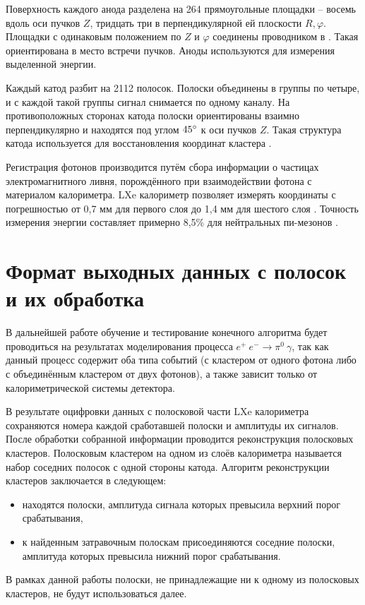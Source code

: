 \documentclass[14pt]{extarticle}
\begin{document}
Поверхность каждого анода разделена на 264 прямоугольные площадки -- восемь вдоль оси пучков $Z$, тридцать три в перпендикулярной ей плоскости $R,\varphi$. Площадки с одинаковым положением по $Z$ и $\varphi$ соединены проводником в . Такая  ориентирована в место встречи пучков. Аноды используются для измерения выделенной энергии.

Каждый катод разбит на 2112 полосок. Полоски объединены в группы по четыре, и с каждой такой группы сигнал снимается по одному каналу. На противоположных сторонах катода полоски ориентированы взаимно перпендикулярно и находятся под углом $45\degree$ к оси пучков $Z$. Такая структура катода используется для восстановления координат кластера \cite{shebalin}.

Регистрация фотонов производится путём сбора информации о частицах электромагнитного ливня, порождённого при взаимодействии фотона с материалом калориметра. LXe калориметр позволяет измерять координаты с погрешностью от 0,7 мм для первого слоя до 1,4 мм для шестого слоя \cite{Epifanov_2011,lxe_2009}. Точность измерения энергии составляет примерно 8,5\% для нейтральных пи-мезонов \cite{Anisenkov_2014}.

\section{Формат выходных данных с полосок и их обработка}
В дальнейшей работе обучение и тестирование конечного алгоритма будет
проводиться на результатах моделирования процесса $e^{+}\:e^{-} \to \pi^{0}\:\gamma$, 
так как данный процесс содержит оба типа событий (с кластером от одного фотона либо
с объединённым кластером от двух фотонов),
а также зависит только от калориметрической системы детектора.

В результате оцифровки данных с полосковой части LXe калориметра сохраняются номера каждой
сработавшей полоски и амплитуды их сигналов. После обработки собранной информации проводится
реконструкция полосковых кластеров. Полосковым кластером на одном из слоёв калориметра называется
набор соседних полосок с одной стороны катода. Алгоритм реконструкции кластеров заключается в
следующем:
\begin{itemize}
    \item находятся полоски, амплитуда сигнала которых превысила верхний порог срабатывания,
    \item к найденным затравочным полоскам присоединяются соседние полоски, амплитуда которых превысила нижний порог срабатывания.
\end{itemize}
В рамках данной работы полоски, не принадлежащие ни к одному из полосковых кластеров, не будут использоваться далее.
\end{document}
